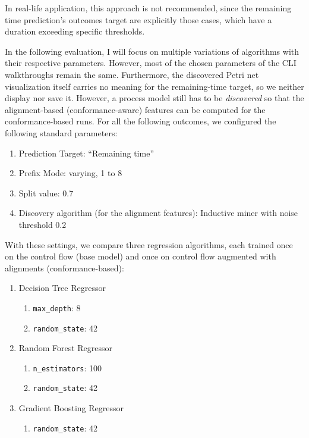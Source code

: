\documentclass[12pt,a4paper]{article}
\begin{document}
In real-life application, this approach is not recommended, since the remaining time prediction's outcomes target are explicitly those cases, which have a duration exceeding specific thresholds.

In the following evaluation, I will focus on multiple variations of algorithms with their respective parameters. However, most of the chosen parameters of the CLI walkthroughs remain the same. Furthermore, the discovered Petri net visualization itself carries no meaning for the remaining-time target, so we neither display nor save it. However, a process model still has to be \emph{discovered} so that the alignment-based (conformance-aware) features can be computed for the conformance-based runs.
For all the following outcomes, we configured the following standard parameters:

\begin{enumerate}
	\item Prediction Target: ``Remaining time''
	\item Prefix Mode: varying, 1 to 8
	\item Split value: 0.7
	\item Discovery algorithm (for the alignment features): Inductive miner with noise threshold 0.2 %
\end{enumerate}

With these settings, we compare three regression algorithms, each trained once on the control flow (base model) and once on control flow augmented with alignments (conformance-based):
\begin{enumerate}
	\item Decision Tree Regressor
	\begin{enumerate}
		\item \texttt{max\_depth}: 8
		\item \texttt{random\_state}: 42
	\end{enumerate}
	\item Random Forest Regressor
	\begin{enumerate}
		\item \texttt{n\_estimators}: 100
		\item \texttt{random\_state}: 42
	\end{enumerate}
	\item Gradient Boosting Regressor
	\begin{enumerate}
		\item \texttt{random\_state}: 42
	\end{enumerate}
\end{enumerate}
\end{document}
